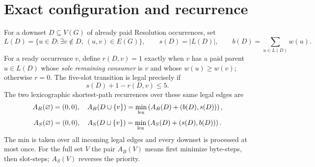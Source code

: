 \documentclass[11pt]{article}
\begin{document}
\section*{Exact configuration and recurrence}
For a downset $D\subseteq V(G)$ of already paid Resolution occurrences, set
\[
L(D)=\{u\in D:\exists v\notin D,\ (u,v)\in E(G)\},\qquad
s(D)=|L(D)|,\qquad b(D)=\sum_{u\in L(D)}w(u).
\]
For a ready occurrence $v$, define $r(D,v)=1$ exactly when $v$ has a paid parent $u\in L(D)$ whose \emph{sole remaining consumer} is $v$ and whose $w(u)\ge w(v)$; otherwise $r=0$. The five-slot transition is legal precisely if
\[
\boxed{s(D)+1-r(D,v)\le 5.}
\]
The two lexicographic shortest-path recurrences over these same legal edges are
\[
A_B(\varnothing)=(0,0),\quad
A_B(D\cup\{v\})=\min_{\rm lex}\left(A_B(D)+(b(D),s(D))\right),
\]
\[
A_S(\varnothing)=(0,0),\quad
A_S(D\cup\{v\})=\min_{\rm lex}\left(A_S(D)+(s(D),b(D))\right).
\]
The min is taken over all incoming legal edges and every downset is processed at most once. For the full set $V$ the pair $A_B(V)$ means first minimize byte-steps, then slot-steps; $A_S(V)$ reverses the priority.
\end{document}
